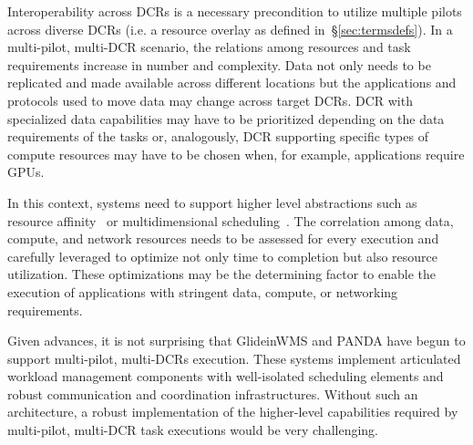 \documentclass{sig-alternate}
\begin{document}
Interoperability across DCRs is a necessary precondition to utilize multiple
pilots across diverse DCRs (i.e. a resource overlay as defined
in~\S\ref{sec:termsdefs}). In a multi-pilot, multi-DCR scenario, the relations
among resources and task requirements increase in number and complexity. Data
not only needs to be replicated and made available across different locations
but the applications and protocols used to move data may change across target
DCRs. DCR with specialized data capabilities may have to be prioritized
depending on the data requirements of the tasks or, analogously, DCR supporting
specific types of compute resources may have to be chosen when, for example,
applications require GPUs.

In this context, \pilot systems need to support higher level abstractions such
as resource affinity~\cite{luckow2014pilot,neumeyer2010s4} or multidimensional
scheduling~\cite{zhu2008multi}. The correlation among data, compute, and network
resources needs to be assessed for every execution and carefully leveraged to
optimize not only time to completion but also resource utilization. These
optimizations may be the determining factor to enable the execution of
applications with stringent data, compute, or networking requirements.

Given advances, it is not surprising that GlideinWMS and PANDA have begun to
support multi-pilot, multi-DCRs execution. These \pilot systems implement
articulated workload management components with well-isolated scheduling
elements and robust communication and coordination infrastructures.  Without
such an architecture, a robust implementation of the higher-level capabilities
required by multi-pilot, multi-DCR task executions would be very challenging.






\end{document}
